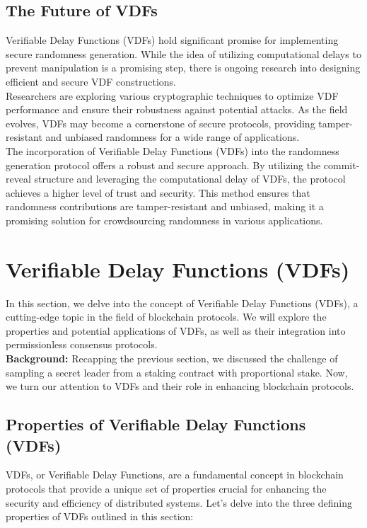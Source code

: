 \subsection{The Future of VDFs}
Verifiable Delay Functions (VDFs) hold significant promise for implementing secure randomness generation. While the idea of utilizing computational delays to prevent manipulation is a promising step, there is ongoing research into designing efficient and secure VDF constructions.\\
Researchers are exploring various cryptographic techniques to optimize VDF performance and ensure their robustness against potential attacks. As the field evolves, VDFs may become a cornerstone of secure protocols, providing tamper-resistant and unbiased randomness for a wide range of applications.\\

The incorporation of Verifiable Delay Functions (VDFs) into the randomness generation protocol offers a robust and secure approach. By utilizing the commit-reveal structure and leveraging the computational delay of VDFs, the protocol achieves a higher level of trust and security. This method ensures that randomness contributions are tamper-resistant and unbiased, making it a promising solution for crowdsourcing randomness in various applications.

\section{Verifiable Delay Functions (VDFs)}
In this section, we delve into the concept of Verifiable Delay Functions (VDFs), a cutting-edge topic in the field of blockchain protocols. We will explore the properties and potential applications of VDFs, as well as their integration into permissionless consensus protocols.\\

\noindent
\textbf{Background:} Recapping the previous section, we discussed the challenge of sampling a secret leader from a staking contract with proportional stake. Now, we turn our attention to VDFs and their role in enhancing blockchain protocols.

\subsection{Properties of Verifiable Delay Functions (VDFs)}
VDFs, or Verifiable Delay Functions, are a fundamental concept in blockchain protocols that provide a unique set of properties crucial for enhancing the security and efficiency of distributed systems. Let's delve into the three defining properties of VDFs outlined in this section:

